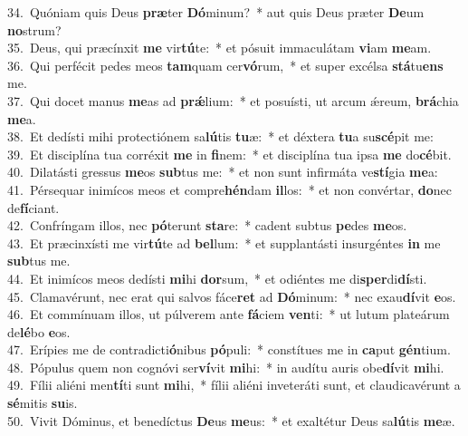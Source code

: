 {34.~}Quóniam quis Deus \textbf{præ}ter \textbf{Dó}minum?~* aut quis Deus præter \textbf{De}um \textbf{no}strum?\\
{35.~}Deus, qui præcínxit \textbf{me} vir\textbf{tú}te:~* et pósuit immaculátam \textbf{vi}am \textbf{me}am.\\
{36.~}Qui perfécit pedes meos \textbf{tam}quam cer\textbf{vó}rum,~* et super excélsa \textbf{stá}tu\textbf{ens} me.\\
{37.~}Qui docet manus \textbf{me}as ad \textbf{prǽ}lium:~* et posuísti, ut arcum ǽreum, \textbf{brá}chia \textbf{me}a.\\
{38.~}Et dedísti mihi protectiónem sa\textbf{lú}tis \textbf{tu}æ:~* et déxtera \textbf{tu}a su\textbf{scé}pit me:\\
{39.~}Et disciplína tua corréxit \textbf{me} in \textbf{fi}nem:~* et disciplína tua ipsa \textbf{me} do\textbf{cé}bit.\\
{40.~}Dilatásti gressus \textbf{me}os \textbf{sub}tus me:~* et non sunt infirmáta ve\textbf{stí}gia \textbf{me}a:\\
{41.~}Pérsequar inimícos meos et compre\textbf{hén}dam \textbf{il}los:~* et non convértar, \textbf{do}nec de\textbf{fí}ciant.\\
{42.~}Confríngam illos, nec \textbf{pó}terunt \textbf{sta}re:~* cadent subtus \textbf{pe}des \textbf{me}os.\\
{43.~}Et præcinxísti me vir\textbf{tú}te ad \textbf{bel}lum:~* et supplantásti insurgéntes \textbf{in} me \textbf{sub}tus me.\\
{44.~}Et inimícos meos dedísti \textbf{mi}hi \textbf{dor}sum,~* et odiéntes me di\textbf{sper}di\textbf{dí}sti.\\
{45.~}Clamavérunt, nec erat qui salvos fáce\textbf{ret} ad \textbf{Dó}minum:~* nec exau\textbf{dí}vit \textbf{e}os.\\
{46.~}Et commínuam illos, ut púlverem ante \textbf{fá}ciem \textbf{ven}ti:~* ut lutum plateárum de\textbf{lé}bo \textbf{e}os.\\
{47.~}Erípies me de contradicti\textbf{ó}nibus \textbf{pó}puli:~* constítues me in \textbf{ca}put \textbf{gén}tium.\\
{48.~}Pópulus quem non cognóvi ser\textbf{ví}vit \textbf{mi}hi:~* in audítu auris obe\textbf{dí}vit \textbf{mi}hi.\\
{49.~}Fílii aliéni men\textbf{tí}ti sunt \textbf{mi}hi,~* fílii aliéni inveteráti sunt, et claudicavérunt a \textbf{sé}mitis \textbf{su}is.\\
{50.~}Vivit Dóminus, et benedíctus \textbf{De}us \textbf{me}us:~* et exaltétur Deus sa\textbf{lú}tis \textbf{me}æ.\\
